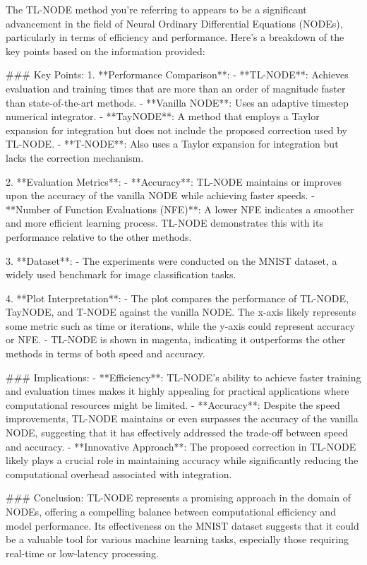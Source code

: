 The TL-NODE method you're referring to appears to be a significant advancement in the field of Neural Ordinary Differential Equations (NODEs), particularly in terms of efficiency and performance. Here's a breakdown of the key points based on the information provided:

### Key Points:
1. **Performance Comparison**:
   - **TL-NODE**: Achieves evaluation and training times that are more than an order of magnitude faster than state-of-the-art methods.
   - **Vanilla NODE**: Uses an adaptive timestep numerical integrator.
   - **TayNODE**: A method that employs a Taylor expansion for integration but does not include the proposed correction used by TL-NODE.
   - **T-NODE**: Also uses a Taylor expansion for integration but lacks the correction mechanism.

2. **Evaluation Metrics**:
   - **Accuracy**: TL-NODE maintains or improves upon the accuracy of the vanilla NODE while achieving faster speeds.
   - **Number of Function Evaluations (NFE)**: A lower NFE indicates a smoother and more efficient learning process. TL-NODE demonstrates this with its performance relative to the other methods.

3. **Dataset**:
   - The experiments were conducted on the MNIST dataset, a widely used benchmark for image classification tasks.

4. **Plot Interpretation**:
   - The plot compares the performance of TL-NODE, TayNODE, and T-NODE against the vanilla NODE. The x-axis likely represents some metric such as time or iterations, while the y-axis could represent accuracy or NFE.
   - TL-NODE is shown in magenta, indicating it outperforms the other methods in terms of both speed and accuracy.

### Implications:
- **Efficiency**: TL-NODE's ability to achieve faster training and evaluation times makes it highly appealing for practical applications where computational resources might be limited.
- **Accuracy**: Despite the speed improvements, TL-NODE maintains or even surpasses the accuracy of the vanilla NODE, suggesting that it has effectively addressed the trade-off between speed and accuracy.
- **Innovative Approach**: The proposed correction in TL-NODE likely plays a crucial role in maintaining accuracy while significantly reducing the computational overhead associated with integration.

### Conclusion:
TL-NODE represents a promising approach in the domain of NODEs, offering a compelling balance between computational efficiency and model performance. Its effectiveness on the MNIST dataset suggests that it could be a valuable tool for various machine learning tasks, especially those requiring real-time or low-latency processing.